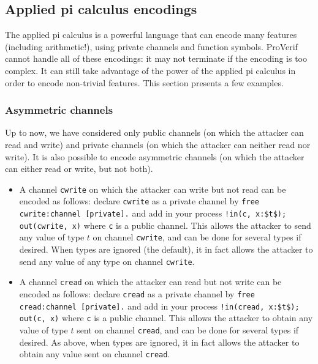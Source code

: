 \documentclass{book}
\begin{document}
\subsection{Applied pi calculus encodings}

The applied pi calculus is a powerful language that can encode many
features (including arithmetic!), using private channels and function
symbols. ProVerif cannot handle all of these encodings: it may not
terminate if the encoding is too complex. It can still take advantage
of the power of the applied pi calculus in order to encode non-trivial features.
This section presents a few examples.


\subsubsection{Asymmetric channels}

Up to now, we have considered only public channels (on which the
attacker can read and write) and private channels (on which the
attacker can neither read nor write). It is also possible to encode
asymmetric channels (on which the attacker can either read or write,
but not both).
\begin{itemize}

\item A channel \lstinline!cwrite! on which the attacker can write
  but not read can be encoded as follows: declare \lstinline!cwrite!
  as a private channel by
%
\lstinline{free cwrite:channel [private].}
%
and add in your process \lstinline{!in(c, x:$t$);} \lstinline{out(cwrite, x)}
where \lstinline!c! is a public channel. This allows the attacker to
send any value of type $t$ on channel \lstinline!cwrite!, and can be
done for several types if desired. When types are ignored (the
default), it in fact allows the attacker to send any value of any
type on channel \lstinline!cwrite!.

\item A channel \lstinline!cread! on which the attacker can read
  but not write can be encoded as follows: declare \lstinline!cread!
  as a private channel by
%
\lstinline{free cread:channel [private].}
%
and add in your process \lstinline{!in(cread, x:$t$);} \lstinline{out(c, x)}
where \lstinline!c! is a public channel. This allows the attacker to
obtain any value of type $t$ sent on channel \lstinline!cread!, and can be
done for several types if desired. As above, when types are ignored,
it in fact allows the attacker to obtain any value sent on channel
\lstinline!cread!.

\end{itemize}
\end{document}
